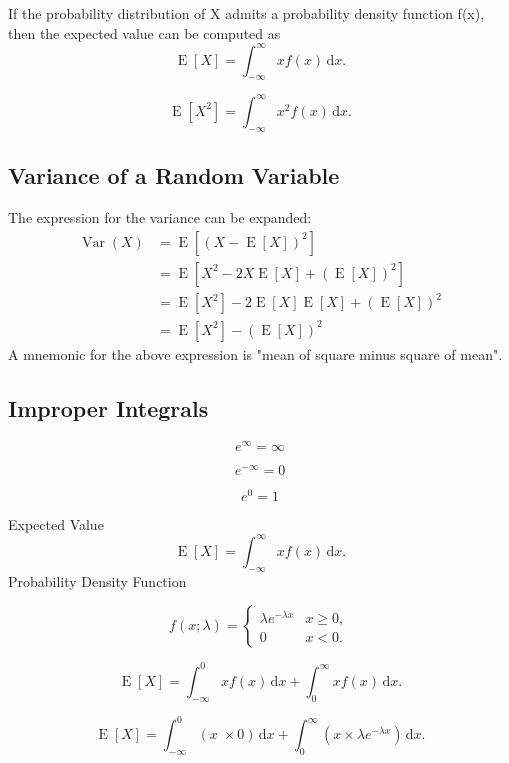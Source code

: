 
\noindent If the probability distribution of X admits a probability density function f(x), then the expected value can be computed as
\[\operatorname{E}[X] = \int_{-\infty}^\infty x f(x)\, \mathrm{d}x .  \]

\[ \operatorname{E}[X^2] = \int_{-\infty}^\infty x^2 f(x)\, \mathrm{d}x .  \]


\subsection*{Variance of a Random Variable}
The expression for the variance can be expanded:
 \begin{align}
\operatorname{Var}(X) &= \operatorname{E}\left[(X - \operatorname{E}[X])^2\right] \\
	&= \operatorname{E}\left[X^2 - 2X\operatorname{E}[X] + (\operatorname{E}[X])^2\right] \\
	&= \operatorname{E}\left[X^2\right] - 2\operatorname{E}[X]\operatorname{E}[X] + (\operatorname{E}[X])^2 \\
	&= \operatorname{E}\left[X^2 \right] - (\operatorname{E}[X])^2 
	\end{align}
A mnemonic for the above expression is "mean of square minus square of mean".

\subsection*{Improper Integrals}
{

\[ e^{\infty} = \infty  \]

\[ e^{ - \infty} = 0  \]

\[ e^{0} = 1 \]
}

{
\noindent Expected Value
\[\operatorname{E}[X] = \int_{-\infty}^\infty x f(x)\, \mathrm{d}x .  \]
\noindent Probability Density Function

\[
f(x;\lambda) = \begin{cases}
\lambda e^{-\lambda x} & x \ge 0, \\
0 & x < 0.
\end{cases}
\]

\[\operatorname{E}[X] = \int_{-\infty}^0 x f(x)\, \mathrm{d}x  + \int_{0}^\infty x f(x)\, \mathrm{d}x .  \]


\[\operatorname{E}[X] = \int_{-\infty}^0 (x\; \times 0) \, \mathrm{d}x  + \int_{0}^\infty (x \times \lambda e^{-\lambda x})\, \mathrm{d}x .  \]

}
